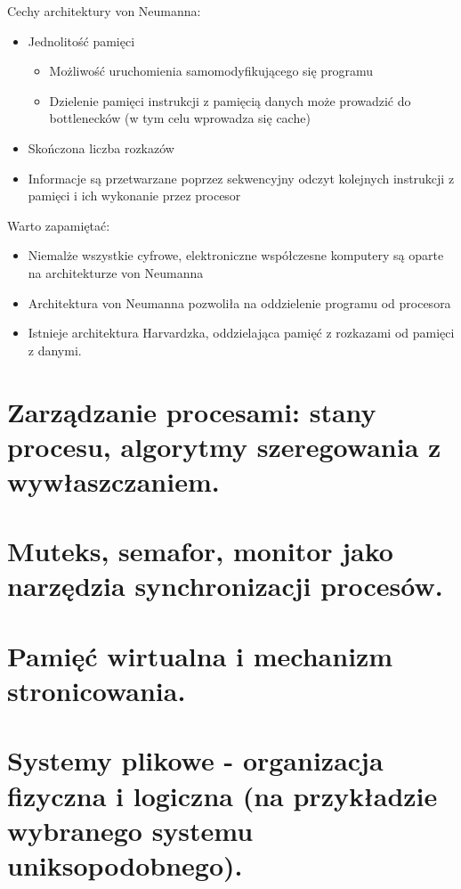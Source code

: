 \documentclass[12pt]{article}
\begin{document}
    Cechy architektury von Neumanna:
    \begin{itemize}
        \item Jednolitość pamięci 
        \begin{itemize}
            \item Możliwość uruchomienia samomodyfikującego się programu
            \item Dzielenie pamięci instrukcji z pamięcią danych może prowadzić do bottlenecków (w tym celu wprowadza się cache)
        \end{itemize}
        \item Skończona liczba rozkazów
        \item Informacje są przetwarzane poprzez sekwencyjny odczyt kolejnych instrukcji z pamięci i ich wykonanie przez procesor
    \end{itemize}

    Warto zapamiętać:
    \begin{itemize}
        \item Niemalże wszystkie cyfrowe, elektroniczne współczesne komputery są oparte na architekturze von Neumanna 
        \item Architektura von Neumanna pozwoliła na oddzielenie programu od procesora
        \item Istnieje architektura Harvardzka, oddzielająca pamięć z rozkazami od pamięci z danymi.
    \end{itemize}
    	
    \newpage

    \section{Zarządzanie procesami: stany procesu, algorytmy szeregowania z wywłaszczaniem.}
    \section{Muteks, semafor, monitor jako narzędzia synchronizacji procesów.}
    \section{Pamięć wirtualna i mechanizm stronicowania.}
    \section{Systemy plikowe - organizacja fizyczna i logiczna (na przykładzie wybranego systemu uniksopodobnego).}
\end{document}
